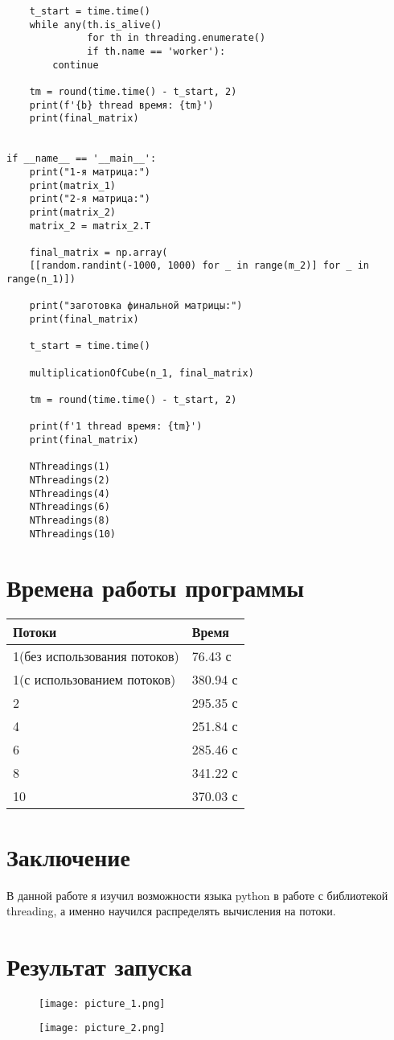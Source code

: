 \documentclass[a4paper, 14pt]{extarticle}
\begin{document}
\begin{verbatim}
    t_start = time.time()
    while any(th.is_alive() 
              for th in threading.enumerate() 
              if th.name == 'worker'):
        continue
    
    tm = round(time.time() - t_start, 2)
    print(f'{b} thread время: {tm}')
    print(final_matrix)


if __name__ == '__main__':
    print("1-я матрица:")
    print(matrix_1)
    print("2-я матрица:")
    print(matrix_2)
    matrix_2 = matrix_2.T

    final_matrix = np.array(
    [[random.randint(-1000, 1000) for _ in range(m_2)] for _ in range(n_1)])

    print("заготовка финальной матрицы:")
    print(final_matrix)

    t_start = time.time()

    multiplicationOfCube(n_1, final_matrix)

    tm = round(time.time() - t_start, 2)

    print(f'1 thread время: {tm}')
    print(final_matrix)
    
    NThreadings(1)
    NThreadings(2)
    NThreadings(4)
    NThreadings(6)
    NThreadings(8)
    NThreadings(10)
\end{verbatim}

\section{Времена работы программы}

\begin{tabular}
{|p{10cm}|p{5cm}|}
\hline
Потоки & Время \\
\hline
1(без использования потоков) & 76.43 с \\
\hline
1(с использованием потоков) & 380.94 с \\
\hline
2 & 295.35 с \\
\hline
4 & 251.84 с \\
\hline
6 & 285.46 с \\
\hline
8 & 341.22 с \\
\hline
10 & 370.03 с \\
\hline
\end{tabular}


\section{Заключение}

    В данной работе я изучил возможности языка python в работе с библиотекой threading, а именно научился распределять вычисления на потоки.

\section{Результат запуска}
    
\begin{figure}[!htb]
	\centering
	\texttt{[image: picture\_1.png]}
\label{fig:picture_1.png}
\end{figure}

\begin{figure}[!htb]
	\centering
	\texttt{[image: picture\_2.png]}
\label{fig:picture_2.png}
\end{figure}
\end{document}
